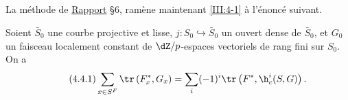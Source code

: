 \subsection{}\label{III:4-4}
La méthode de \hyperref[II]{Rapport} \S 6, ramène maintenant \ref{III:4-1} à l'énoncé suivant.

\begin{theorem_}\label{III:4-1bis}
Soient $\bar S_0$ une courbe projective et lisse, 
$j:S_0\hookrightarrow \bar S_0$ un ouvert dense de $\bar S_0$, et $G_0$ un 
faisceau localement constant de $\dZ/p$-espaces vectoriels de rang fini sur 
$S_0$. On a 
\begin{equation*}\tag{4.4.1}\label{III:eq:4-4-1}
  \sum_{x\in S^F} \tr\left(F_x^*,G_x\right) = \sum_i (-1)^i \tr\left(F^*,\h_c^i(S,G)\right) \text{.}
\end{equation*}
\end{theorem_}
